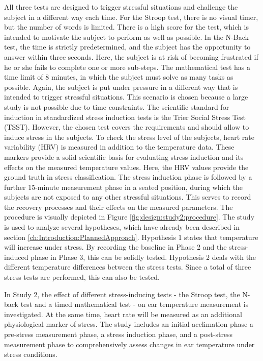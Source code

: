 All three tests are designed to trigger stressful situations and challenge the subject in a different way each time.
For the Stroop test, there is no visual timer, but the number of words is limited. 
There is a high score for the test, which is intended to motivate the subject to perform as well as possible. 
In the N-Back test, the time is strictly predetermined, and the subject has the opportunity to answer within three seconds.
Here, the subject is at risk of becoming frustrated if he or she fails to complete one or more sub-steps.
The mathematical test has a time limit of 8 minutes, in which the subject must solve as many tasks as possible.
Again, the subject is put under pressure in a different way that is intended to trigger stressful situations.
This scenario is chosen because a large study is not possible due to time constraints. 
The scientific standard for induction in standardized stress induction tests is the Trier Social Stress Test (TSST). 
However, the chosen test covers the requirements and should allow to induce stress in the subjects.
To check the stress level of the subjects, heart rate variability (HRV) is measured in addition to the temperature data. 
These markers provide a solid scientific basis for evaluating stress induction and its effects on the measured temperature values.
Here, the HRV values provide the ground truth in stress classification.
The stress induction phase is followed by a further 15-minute measurement phase in a seated position, during which the subjects are not exposed to any other stressful situations. 
This serves to record the recovery processes and their effects on the measured parameters. 
The procedure is visually depicted in Figure \ref{fig:design:study2:procedure}.
The study is used to analyze several hypotheses, which have already been described in section \ref{ch:Introduction:PlannedApproach}.
Hypothesis 1 states that temperature will increase under stress.
By recording the baseline in Phase 2 and the stress-induced phase in Phase 3, this can be solidly tested.
Hypothesis 2 deals with the different temperature differences between the stress tests.
Since a total of three stress tests are performed, this can also be tested.

In Study 2, the effect of different stress-inducing tests - the Stroop test, the N-back test and a timed mathematical test - on ear temperature measurement is investigated.
At the same time, heart rate will be measured as an additional physiological marker of stress. 
The study includes an initial acclimation phase a pre-stress measurement phase, a stress induction phase, and a post-stress measurement phase to comprehensively assess changes in ear temperature under stress conditions.
